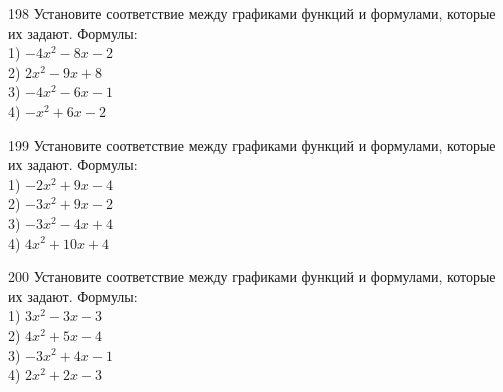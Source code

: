 \documentclass[4apaper]{article}
\begin{document}
\begin{taskBN}{198}
Установите соответствие между графиками функций и формулами, которые их задают. Формулы: \\1) $-4x^2-8x-2$\\2) $2x^2-9x+8$\\3) $-4x^2-6x-1$\\4) $-x^2+6x-2$
\end{taskBN}

\begin{taskBN}{199}
Установите соответствие между графиками функций и формулами, которые их задают. Формулы: \\1) $-2x^2+9x-4$\\2) $-3x^2+9x-2$\\3) $-3x^2-4x+4$\\4) $4x^2+10x+4$
\end{taskBN}

\begin{taskBN}{200}
Установите соответствие между графиками функций и формулами, которые их задают. Формулы: \\1) $3x^2-3x-3$\\2) $4x^2+5x-4$\\3) $-3x^2+4x-1$\\4) $2x^2+2x-3$
\end{taskBN}

\newpage
 
\end{document}
